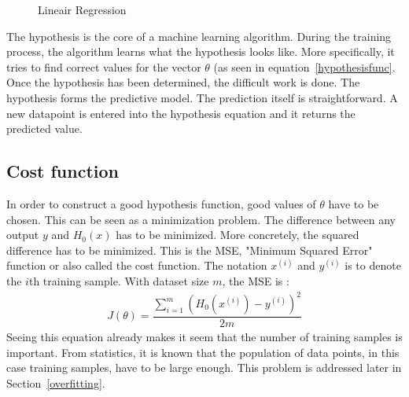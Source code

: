 \begin{figure}[H]
\centering
{}
\caption{Lineair Regression} \label{fig:regression}
\end{figure}
\noindent The hypothesis is the core of a machine learning algorithm. During the training process, the algorithm learns what the hypothesis looks like. More specifically, it tries to find correct values for the vector $\theta$ (as seen in equation~\ref{hypothesisfunc}. Once the hypothesis has been determined, the difficult work is done. The hypothesis forms the predictive model. The prediction itself is straightforward. A new datapoint is entered into the hypothesis equation and it returns the predicted value.

\subsection{Cost function}
\label{costfunction}
In order to construct a good hypothesis function, good values of $\theta$ have to be chosen. This can be seen as a minimization problem. The difference between any output $y$ and $H_0(x)$ has to be minimized. More concretely, the squared difference has to be minimized. This is the MSE, "Minimum Squared Error" function or also called the cost function. The notation $x^{(i)}$ and $y^{(i)}$ is to denote the $i$th training sample. With dataset size $m$, the MSE is \cite{stanford}:
\begin{align}
J(\theta) = \dfrac{\sum\limits_{i=1}^m(H_0(x^{(i)}) - y^{(i)})^2}{2m} 
\end{align}
\noindent Seeing this equation already makes it seem that the number of training samples is important. From statistics, it is known that the population of data points, in this case training samples, have to be large enough. This problem is addressed later in Section~\ref{overfitting}.

